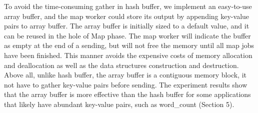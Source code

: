 
To avoid the time-consuming gather in hash buffer, we  implement an easy-to-use array buffer, and the map worker could store its output by appending  key-value pairs to array buffer.
The array buffer is initially sized to a default value, and it can be reused in the hole of Map phase.
The map worker will indicate the buffer as empty at the end of a sending, but will not free the memory until all map jobs have been finished.
This manner avoids the expensive costs of memory allocation and deallocation as well as the data structures construction and destruction.
Above all, unlike hash buffer, the array buffer is a contiguous memory block, it not have to gather key-value pairs before sending.
The experiment results show that the array buffer is more effective than the hash buffer for some applications that likely have abundant key-value pairs, such as word\_count (Section 5).









